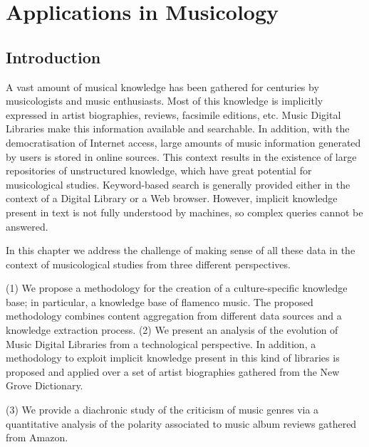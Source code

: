 
\chapter{Applications in Musicology}
\label{sec:musicology}

\section{Introduction}
\label{sec:musicology:introduction}

A vast amount of musical knowledge has been gathered for centuries by musicologists and music enthusiasts. Most of this knowledge is implicitly expressed in artist biographies, reviews, facsimile editions, etc. Music Digital Libraries make this information available and searchable. 
In addition, with the democratisation of Internet access, large amounts of music information generated by users is stored in online sources. This context results in the existence of large repositories of unstructured knowledge, which have great potential for musicological studies.
Keyword-based search is generally provided either in the context of a Digital Library or a Web browser. However, implicit knowledge present in text is not fully understood by machines, so complex queries cannot be answered. 

In this chapter we address the challenge of making sense of all these data in the context of musicological studies from three different perspectives. 

(1) 
We propose a methodology for the creation of a culture-specific knowledge base; in particular, a knowledge base of flamenco music. The proposed methodology combines content aggregation from different data sources and a knowledge extraction process. %
(2) 
We present an analysis of the evolution of Music Digital Libraries from a technological perspective. In addition, a methodology to exploit implicit knowledge present in this kind of libraries is proposed and applied over a set of artist biographies gathered from the New Grove Dictionary. 

(3)
We provide a diachronic study of the criticism of music genres via a quantitative analysis of the polarity associated to music album reviews gathered from Amazon. %

